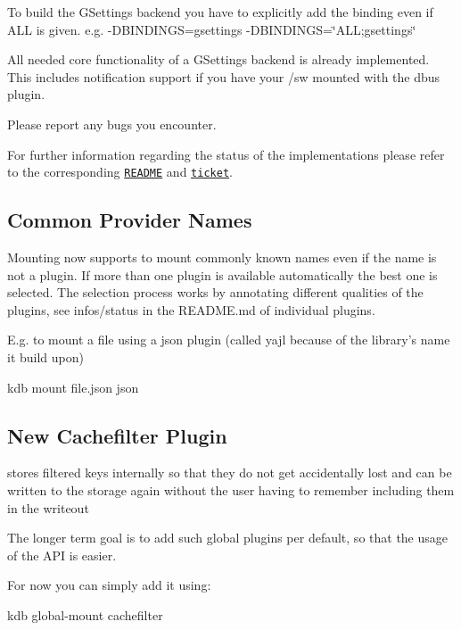 To build the G\+Settings backend you have to explicitly add the binding even if {\ttfamily A\+L\+L} is given. e.\+g. {\ttfamily -\/\+D\+B\+I\+N\+D\+I\+N\+G\+S=gsettings} {\ttfamily -\/\+D\+B\+I\+N\+D\+I\+N\+G\+S=\char`\"{}\+A\+L\+L;gsettings\char`\"{}}

All needed core functionality of a G\+Settings backend is already implemented. This includes notification support if you have your {\ttfamily /sw} mounted with the dbus plugin.

Please report any bugs you encounter.

For further information regarding the status of the implementations please refer to the corresponding \href{https://github.com/elektrainitiative/libelektra/tree/master/src/bindings/gsettings}{\tt R\+E\+A\+D\+M\+E} and \href{https://github.com/ElektraInitiative/libelektra/issues/775}{\tt ticket}.

\subsection*{Common Provider Names}

Mounting now supports to mount commonly known names even if the name is not a plugin. If more than one plugin is available automatically the best one is selected. The selection process works by annotating different qualities of the plugins, see {\ttfamily infos/status} in the R\+E\+A\+D\+M\+E.\+md of individual plugins.

E.\+g. to mount a file using a json plugin (called yajl because of the library's name it build upon) \begin{DoxyVerb}kdb mount file.json json
\end{DoxyVerb}


\subsection*{New Cachefilter Plugin}

stores filtered keys internally so that they do not get accidentally lost and can be written to the storage again without the user having to remember including them in the writeout

The longer term goal is to add such global plugins per default, so that the usage of the A\+P\+I is easier.

For now you can simply add it using\+: \begin{DoxyVerb} kdb global-mount cachefilter
\end{DoxyVerb}


